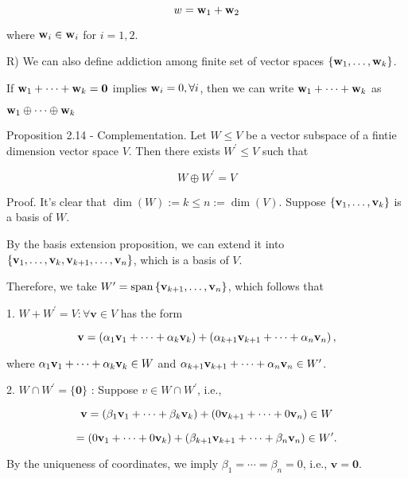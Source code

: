\documentclass[11pt]{article}
\begin{document}
\[
w = {\bf w}_1 + {\bf w}_2
\]

where \({\bf w}_{i} \in  {\bf w}_{i}\) for \(i = 1,2\).

R) We can also define addiction among finite set of vector spaces \(\left\{  {{\bf w}_1,\ldots ,{\bf w}_{k}}\right\}\).

If \({\bf w}_1 + \cdots  + {\bf w}_{k} = \mathbf{0}\) implies \({\bf w}_{i} = 0,\forall i\), then we can write \({\bf w}_1 + \cdots  + {\bf w}_{k}\) as

\({\bf w}_1 \oplus  \cdots  \oplus  {\bf w}_{k}\)

Proposition 2.14 - Complementation. Let \(W \leq  V\) be a vector subspace of a fintie dimension vector space \(V\). Then there exists \({W}^{\prime } \leq  V\) such that

\[
W \oplus  {W}^{\prime } = V
\]

Proof. It’s clear that \(\dim \left( W\right)  \mathrel{\text{ := }} k \leq  n \mathrel{\text{ := }} \dim \left( V\right)\). Suppose \(\left\{  {{\bf v}_1,\ldots ,{\bf v}_{k}}\right\}\) is a basis of \(W\).

By the basis extension proposition, we can extend it into \(\left\{  {{\bf v}_1,\ldots ,{\bf v}_{k},{\bf v}_{k + 1},\ldots ,{\bf v}_n}\right\}\), which is a basis of \(V\).

Therefore, we take \({W}^{\prime } = \operatorname{span}\left\{  {{\bf v}_{k + 1},\ldots ,{\bf v}_n}\right\}\), which follows that

1. \(W + {W}^{\prime } = V : \forall \mathbf{v} \in  V\) has the form

\[
\mathbf{v} = \left( {\alpha_1{\bf v}_1 + \cdots  + \alpha_{k}{\bf v}_{k}}\right)  + \left( {\alpha_{k + 1}{\bf v}_{k + 1} + \cdots  + \alpha_n{\bf v}_n}\right) ,
\]

where \(\alpha_1{\bf v}_1 + \cdots  + \alpha_{k}{\bf v}_{k} \in  W\) and \(\alpha_{k + 1}{\bf v}_{k + 1} + \cdots  + \alpha_n{\bf v}_n \in  {W}^{\prime }\).

2. \(W \cap  {W}^{\prime } = \{ \mathbf{0}\}\) : Suppose \(v \in  W \cap  {W}^{\prime }\), i.e.,

\[
\mathbf{v} = \left( {\beta_1{\bf v}_1 + \cdots  + \beta_{k}{\bf v}_{k}}\right)  + \left( {0{\bf v}_{k + 1} + \cdots  + 0{\bf v}_n}\right)  \in  W
\]

\[
= \left( {0{\bf v}_1 + \cdots  + 0{\bf v}_{k}}\right)  + \left( {\beta_{k + 1}{\bf v}_{k + 1} + \cdots  + \beta_n{\bf v}_n}\right)  \in  {W}^{\prime }.
\]

By the uniqueness of coordinates, we imply \(\beta_1 = \cdots  = \beta_n = 0\), i.e., \(\mathbf{v} = \mathbf{0}\).
\end{document}
